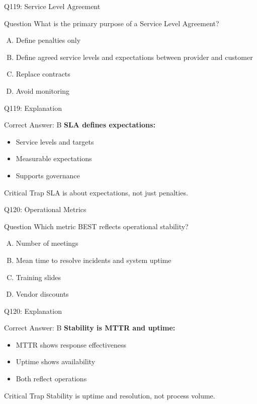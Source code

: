 \documentclass{beamer}
\begin{document}
	\begin{frame}{Q119: Service Level Agreement}
		\begin{block}{Question}
			What is the primary purpose of a Service Level Agreement?
		\end{block}
		\begin{enumerate}[(A)]
			\item Define penalties only
			\item Define agreed service levels and expectations between provider and customer
			\item Replace contracts
			\item Avoid monitoring
		\end{enumerate}
	\end{frame}
	
	\begin{frame}{Q119: Explanation}
		\begin{block}{Correct Answer: B}
			\textbf{SLA defines expectations:}
			\begin{itemize}
				\item Service levels and targets
				\item Measurable expectations
				\item Supports governance
			\end{itemize}
		\end{block}
		\begin{alertblock}{Critical Trap}
			SLA is about expectations, not just penalties.
		\end{alertblock}
	\end{frame}
	
	\begin{frame}{Q120: Operational Metrics}
		\begin{block}{Question}
			Which metric BEST reflects operational stability?
		\end{block}
		\begin{enumerate}[(A)]
			\item Number of meetings
			\item Mean time to resolve incidents and system uptime
			\item Training slides
			\item Vendor discounts
		\end{enumerate}
	\end{frame}
	
	\begin{frame}{Q120: Explanation}
		\begin{block}{Correct Answer: B}
			\textbf{Stability is MTTR and uptime:}
			\begin{itemize}
				\item MTTR shows response effectiveness
				\item Uptime shows availability
				\item Both reflect operations
			\end{itemize}
		\end{block}
		\begin{alertblock}{Critical Trap}
			Stability is uptime and resolution, not process volume.
		\end{alertblock}
	\end{frame}
	
\end{document}
